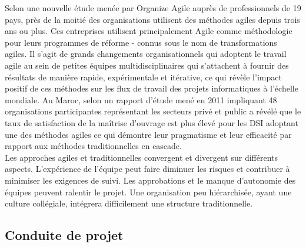 Selon une nouvelle étude menée par Organize Agile\cite{organize_agile} auprès de professionnels de 19 pays, près de la moitié des organisations utilisent des méthodes agiles depuis trois ans ou plus. Ces entreprises utilisent principalement Agile comme méthodologie pour leurs programmes de réforme - connus sous le nom de transformations agiles. Il s'agit de grands changements organisationnels qui adoptent le travail agile au sein de petites équipes multidisciplinaires qui s'attachent à fournir des résultats de manière rapide, expérimentale et itérative, ce qui révèle l'impact positif de ces méthodes sur les flux de travail des projets informatiques à l'échelle mondiale. Au Maroc, selon un rapport d'étude mené en 2011 impliquant 48 organisations participantes représentant les secteurs privé et public a révélé que le taux de satisfaction de la maîtrise d'ouvrage est plus élevé pour les DSI adoptant une des méthodes agiles ce qui démontre leur pragmatisme et leur efficacité par rapport aux méthodes traditionnelles en cascade\cite{badr_2011}.\\

Les approches agiles et traditionnelles convergent et divergent sur différents aspects. L’expérience de l’équipe peut faire diminuer les risques et contribuer à minimiser les exigences de suivi. Les approbations et le manque d’autonomie des équipes peuvent ralentir le projet. Une organisation peu hiérarchisée, ayant une culture collégiale, intégrera difficilement une structure traditionnelle.\\
\subsection{Conduite de projet}
